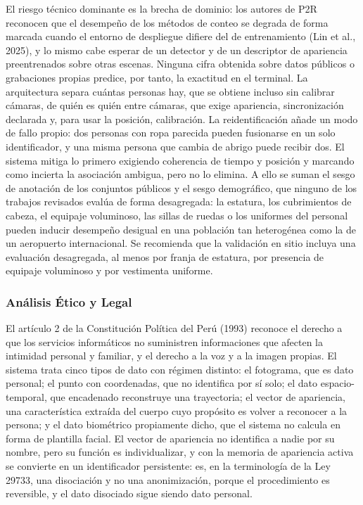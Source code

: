 El riesgo técnico dominante es la brecha de dominio: los autores de P2R reconocen que el
desempeño de los métodos de conteo se degrada de forma marcada cuando el entorno de
despliegue difiere del de entrenamiento (Lin et al., 2025), y lo mismo cabe esperar de un
detector y de un descriptor de apariencia preentrenados sobre otras escenas. Ninguna cifra
obtenida sobre datos públicos o grabaciones propias predice, por tanto, la exactitud en el
terminal. La arquitectura separa cuántas personas hay, que se obtiene incluso sin calibrar
cámaras, de quién es quién entre cámaras, que exige apariencia, sincronización declarada y,
para usar la posición, calibración. La reidentificación añade un modo de fallo propio: dos
personas con ropa parecida pueden fusionarse en un solo identificador, y una misma persona
que cambia de abrigo puede recibir dos. El sistema mitiga lo primero exigiendo coherencia de
tiempo y posición y marcando como incierta la asociación ambigua, pero no lo elimina. A ello se
suman el sesgo de anotación de los conjuntos públicos y el sesgo demográfico, que ninguno de
los trabajos revisados evalúa de forma desagregada: la estatura, los cubrimientos de cabeza, el
equipaje voluminoso, las sillas de ruedas o los uniformes del personal pueden inducir
desempeño desigual en una población tan heterogénea como la de un aeropuerto
internacional. Se recomienda que la validación en sitio incluya una evaluación desagregada, al
menos por franja de estatura, por presencia de equipaje voluminoso y por vestimenta
uniforme.

\subsubsection{Análisis Ético y Legal}
\label{subsec:impacto-etico}

El artículo 2 de la Constitución Política del Perú (1993) reconoce el derecho a que los servicios
informáticos no suministren informaciones que afecten la intimidad personal y familiar, y el
derecho a la voz y a la imagen propias. El sistema trata cinco tipos de dato con régimen distinto:
el fotograma, que es dato personal; el punto con coordenadas, que no identifica por sí solo; el
dato espacio-temporal, que encadenado reconstruye una trayectoria; el vector de apariencia,
una característica extraída del cuerpo cuyo propósito es volver a reconocer a la persona; y el
dato biométrico propiamente dicho, que el sistema no calcula en forma de plantilla facial. El
vector de apariencia no identifica a nadie por su nombre, pero su función es individualizar, y
con la memoria de apariencia activa se convierte en un identificador persistente: es, en la
terminología de la Ley 29733, una disociación y no una anonimización, porque el
procedimiento es reversible, y el dato disociado sigue siendo dato personal.

